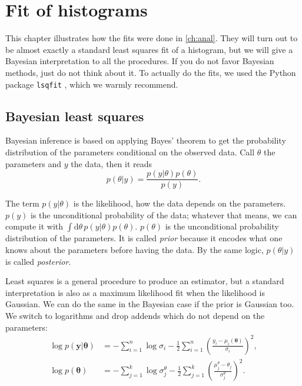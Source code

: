 \chapter{Fit of histograms}
\label{ch:fit}

This chapter illustrates how the fits were done in \autoref{ch:anal}. They will
turn out to be almost exactly a standard least squares fit of a histogram, but
we will give a Bayesian interpretation to all the procedures. If you do not
favor Bayesian methods, just do not think about it. To actually do the fits, we
used the Python package \texttt{lsqfit} \cite{lepage2021}, which we warmly
recommend.

\section{Bayesian least squares}

Bayesian inference is based on applying Bayes' theorem to get the probability
distribution of the parameters conditional on the observed data. Call $\theta$
the parameters and $y$ the data, then it reads
%
\begin{equation}
    p(\theta|y) = \frac {p(y|\theta) p(\theta)} {p(y)}.
\end{equation}

The term $p(y|\theta)$ is the likelihood, how the data depends on the
parameters. $p(y)$ is the unconditional probability of the data; whatever that
means, we can compute it with $\int\mathrm d\theta\,p(y|\theta)p(\theta)$.
$p(\theta)$ is the unconditional probability distribution of the parameters. It
is called \emph{prior} because it encodes what one knows about the parameters
before having the data. By the same logic, $p(\theta|y)$ is called
\emph{posterior}.

Least squares is a general procedure to produce an estimator, but a standard
interpretation is also as a maximum likelihood fit when the likelihood is
Gaussian. We can do the same in the Bayesian case if the prior is Gaussian too.
We switch to logarithms and drop addends which do not depend on the parameters:
%
\begin{align}
    \log p(\mathbf y|\boldsymbol\theta) &=
    -\sum_{i=1}^n \log\sigma_i
    -\frac 12 \sum_{i=1}^n
    \left( \frac {y_i - \mu_i(\boldsymbol\theta)} {\sigma_i} \right)^2, \\
    \log p(\boldsymbol\theta) &=
    -\sum_{j=1}^k \log\sigma^\theta_j
    -\frac 12 \sum_{j=1}^k
    \left( \frac {\mu^\theta_j - \theta_j} {\sigma^\theta_j} \right)^2.
\end{align}

